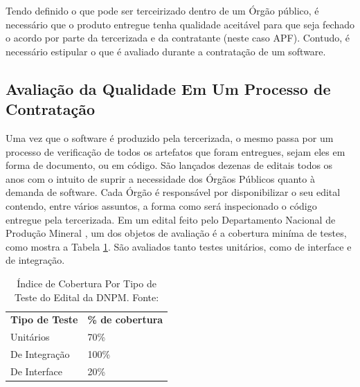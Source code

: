 Tendo definido o que pode ser terceirizado dentro de um Órgão público, é necessário que o produto entregue tenha qualidade aceitável para que seja fechado o acordo por parte da tercerizada e da contratante (neste caso APF). Contudo, é necessário estipular o que é avaliado durante a contratação de um software.

\subsection{Avaliação da Qualidade Em Um Processo de Contratação }
Uma vez que o software é produzido pela tercerizada, o mesmo passa por um processo de verificação de todos os artefatos que foram entregues, sejam eles em forma de documento, ou em código. São lançados dezenas de editais todos os anos com o intuito de suprir a necessidade dos Órgãos Públicos quanto à demanda de software. Cada Órgão é responsável por disponibilizar o seu edital contendo, entre vários assuntos, a forma como será inspecionado o código entregue pela tercerizada. Em um edital feito pelo Departamento Nacional de Produção Mineral \cite{edital}, um dos objetos de avaliação é a cobertura miníma de testes, como mostra a Tabela \ref{tabela1}. São avaliados tanto testes unitários, como de interface e de integração.

\begin{table}[h!]
\centering
\caption{Índice de Cobertura Por Tipo de Teste do Edital da DNPM. Fonte:\cite{edital}}
\label{tabela1}
\begin{tabular}{ll}
\textbf{Tipo de Teste} & \textbf{\% de cobertura} \\
Unitários              & 70\%                     \\
De Integração          & 100\%                    \\
De Interface           & 20\%                    
\end{tabular}
\end{table}



